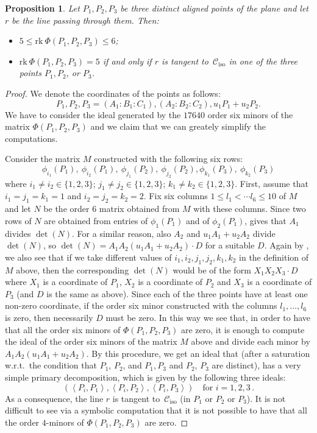 \documentclass[11pt, a4paper, reqno, captions=tableheading,bibliography=totoc]{scrartcl}
\theoremstyle{plain}
\newtheorem{prop}[lemma]{Proposition}
\theoremstyle{definition}
\newcommand{\iso}{\mathcal{C}_{\mathrm{iso}}}
\newcommand{\scl}[2]{\left\langle {#1}, {#2} \right\rangle}
\begin{document}
\begin{prop}
\label{proposition:three_aligned_ranks}
Let $P_1, P_2, P_3$ be three distinct aligned points of the plane and let
$r$ be the line passing through them. Then:
\begin{itemize}
\item $5 \leq \text{rk}\ \Phi(P_1, P_2, P_3) \leq 6$;
\item
$\text{rk}\ \Phi(P_1, P_2, P_3) = 5$ if and only if $r$ is tangent
to~$\iso$ in one of the three points $P_1, P_2$, or $P_3$.
\end{itemize}
\end{prop}
\begin{proof} We denote the coordinates of the points as follows:
\[
P_1, P_2, P_3 = (A_1: B_1: C_1), (A_2: B_2: C_2), u_1P_1+u_2P_2.
\]
We have to consider the ideal generated by the $17640$ order six
minors of the matrix $\Phi(P_1, P_2, P_3)$ and we
claim that we can greately simplify
the computations.

Consider the matrix $M$ constructed with the following six rows:
\[
\phi_{i_1}(P_1), \ \phi_{i_2}(P_1), \ \phi_{j_1}(P_2),\  \phi_{j_2}(P_2),
\phi_{k_1}(P_3), \ \phi_{k_2}(P_3)
\]
where $i_1 \not= i_2 \in \{1, 2, 3\}$; $j_1 \not= j_2 \in \{1, 2, 3\}$;
$k_1 \not= k_2 \in \{1, 2, 3\}$.
First, assume that $i_1=j_1=k_1=1$ and
$i_2=j_2=k_2=2$. Fix six columns
$1\leq l_1 < \cdots l_6 \leq 10$ of $M$ and let $N$ be the order $6$ matrix
obtained from $M$ with these columns. Since two rows of $N$ are obtained from
entries of $\phi_1(P_1)$ and of $\phi_2(P_1)$,
 gives that $A_1$ divides $\det(N)$. For a similar
reason, also $A_2$ and $u_1A_1+u_2A_2$ divide $\det(N)$, so
$\det(N) = A_1A_2(u_1A_1+u_2A_2)\cdot D$ for a suitable $D$.
Again by , we also see that if we take different values of
$i_1, i_2, j_1, j_2, k_1, k_2$ in the definition of $M$ above, then
the corresponding $\det(N)$ would be of the form $X_1X_2X_3\cdot D$ where
$X_1$ is a coordinate of $P_1$, $X_2$ is a coordinate of $P_2$ and $X_3$ is
a coordinate of $P_3$ (and $D$ is the same as above). Since each of the three
points have at least one non-zero coordinate, if the order six minor
constructed with the columns $l_1, \dots, l_6$ is zero, then necessarily $D$
must be zero. In this way we see that, in order to have that all the order
six minors of $\Phi(P_1, P_2, P_3)$ are zero, it is enough to compute the
ideal of the order six minors of the matrix $M$ above and divide each
minor by $A_1A_2(u_1A_1+u_2A_2)$. By this procedure, we get an ideal that (after
a saturation w.r.t.\ the condition that $P_1$, $P_2$, and $P_1, P_3$ and
$P_2$, $P_3$ are distinct), has
a very simple primary decomposition, which is given by the following three
ideals:
\[
\left(\scl{P_i}{P_1}, \scl{P_i}{P_2},\scl{P_i}{P_3}\right) \quad
\mbox{for } i = 1, 2, 3 \,.
\]
As a consequence, the line $r$ is tangent to~$\iso$
(in $P_1$ or $P_2$ or $P_3$).
It is not difficult to see via a symbolic computation that it is not possible to have that all the order
$4$-minors of $\Phi(P_1, P_2, P_3)$ are zero.
\end{proof}
\end{document}
